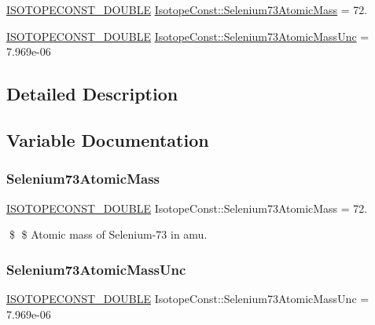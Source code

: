 \begin{DoxyCompactItemize}
\item 
\mbox{\hyperlink{group___isotope_const-_macros_ga8f45a7272ce02c0b4c65c44636ed719a}{I\+S\+O\+T\+O\+P\+E\+C\+O\+N\+S\+T\+\_\+\+D\+O\+U\+B\+LE}} \mbox{\hyperlink{group___isotope_const-_selenium-_se73_ga43f9a3d97bcfa12bca4950f8da25df75}{Isotope\+Const\+::\+Selenium73\+Atomic\+Mass}} = 72.
\item 
\mbox{\hyperlink{group___isotope_const-_macros_ga8f45a7272ce02c0b4c65c44636ed719a}{I\+S\+O\+T\+O\+P\+E\+C\+O\+N\+S\+T\+\_\+\+D\+O\+U\+B\+LE}} \mbox{\hyperlink{group___isotope_const-_selenium-_se73_ga74008ad2021b8b816f0392bf75c43fa6}{Isotope\+Const\+::\+Selenium73\+Atomic\+Mass\+Unc}} = 7.\+969e-\/06
\end{DoxyCompactItemize}


\subsection{Detailed Description}


\subsection{Variable Documentation}
\mbox{\label{group___isotope_const-_selenium-_se73_ga43f9a3d97bcfa12bca4950f8da25df75}} 
\subsubsection{\texorpdfstring{Selenium73\+Atomic\+Mass}{Selenium73AtomicMass}}
{\footnotesize\ttfamily \mbox{\hyperlink{group___isotope_const-_macros_ga8f45a7272ce02c0b4c65c44636ed719a}{I\+S\+O\+T\+O\+P\+E\+C\+O\+N\+S\+T\+\_\+\+D\+O\+U\+B\+LE}} Isotope\+Const\+::\+Selenium73\+Atomic\+Mass = 72.}

\$ \$ Atomic mass of Selenium-\/73 in amu. \mbox{\label{group___isotope_const-_selenium-_se73_ga74008ad2021b8b816f0392bf75c43fa6}} 
\subsubsection{\texorpdfstring{Selenium73\+Atomic\+Mass\+Unc}{Selenium73AtomicMassUnc}}
{\footnotesize\ttfamily \mbox{\hyperlink{group___isotope_const-_macros_ga8f45a7272ce02c0b4c65c44636ed719a}{I\+S\+O\+T\+O\+P\+E\+C\+O\+N\+S\+T\+\_\+\+D\+O\+U\+B\+LE}} Isotope\+Const\+::\+Selenium73\+Atomic\+Mass\+Unc = 7.\+969e-\/06}

